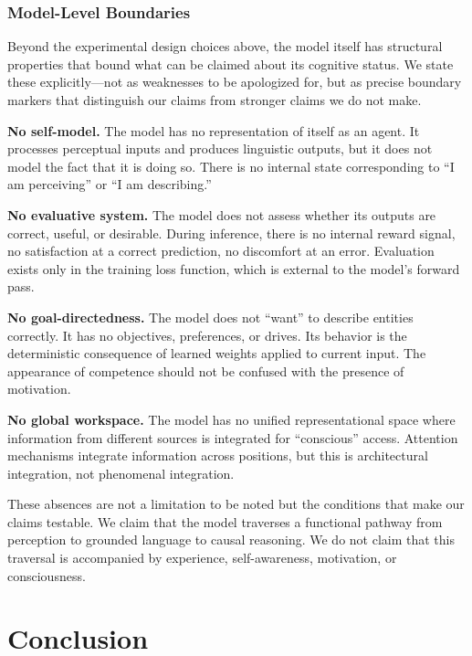 \documentclass{article}
\begin{document}
\subsubsection{Model-Level Boundaries}

Beyond the experimental design choices above, the model itself has structural properties that bound what can be claimed about its cognitive status. We state these explicitly---not as weaknesses to be apologized for, but as precise boundary markers that distinguish our claims from stronger claims we do not make.

\textbf{No self-model.} The model has no representation of itself as an agent. It processes perceptual inputs and produces linguistic outputs, but it does not model the fact that it is doing so. There is no internal state corresponding to ``I am perceiving'' or ``I am describing.''

\textbf{No evaluative system.} The model does not assess whether its outputs are correct, useful, or desirable. During inference, there is no internal reward signal, no satisfaction at a correct prediction, no discomfort at an error. Evaluation exists only in the training loss function, which is external to the model's forward pass.

\textbf{No goal-directedness.} The model does not ``want'' to describe entities correctly. It has no objectives, preferences, or drives. Its behavior is the deterministic consequence of learned weights applied to current input. The appearance of competence should not be confused with the presence of motivation.

\textbf{No global workspace.} The model has no unified representational space where information from different sources is integrated for ``conscious'' access. Attention mechanisms integrate information across positions, but this is architectural integration, not phenomenal integration.

These absences are not a limitation to be noted but the conditions that make our claims testable. We claim that the model traverses a functional pathway from perception to grounded language to causal reasoning. We do not claim that this traversal is accompanied by experience, self-awareness, motivation, or consciousness.

\section{Conclusion}
\end{document}
